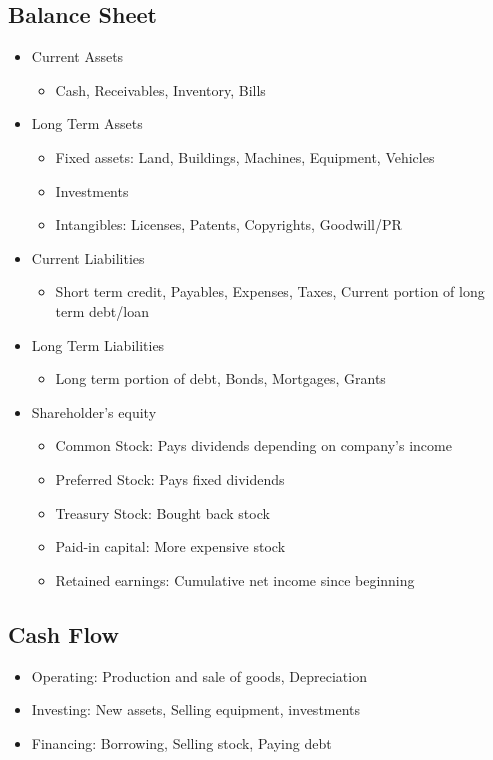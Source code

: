 \documentclass[landscape, letterpaper, 10pt]{article}
\begin{document}
\begin{multicols}{3}
    \subsection*{Balance Sheet}
    \begin{itemize}
        \item Current Assets
              \begin{itemize}
                  \item Cash, Receivables, Inventory, Bills
              \end{itemize}
        \item Long Term Assets
              \begin{itemize}
                  \item Fixed assets: Land, Buildings, Machines, Equipment, Vehicles
                  \item Investments
                  \item Intangibles: Licenses, Patents, Copyrights, Goodwill/PR
              \end{itemize}
        \item Current Liabilities
              \begin{itemize}
                  \item Short term credit, Payables, Expenses, Taxes, Current portion of long term debt/loan
              \end{itemize}
        \item Long Term Liabilities
              \begin{itemize}
                  \item Long term portion of debt, Bonds, Mortgages, Grants
              \end{itemize}
        \item Shareholder's equity
              \begin{itemize}
                  \item Common Stock: Pays dividends depending on company's income
                  \item Preferred Stock: Pays fixed dividends
                  \item Treasury Stock: Bought back stock
                  \item Paid-in capital: More expensive stock
                  \item Retained earnings: Cumulative net income since beginning
              \end{itemize}
    \end{itemize}
    \subsection*{Cash Flow}
    \begin{itemize}
        \item Operating: Production and sale of goods, Depreciation
        \item Investing: New assets, Selling equipment, investments
        \item Financing: Borrowing, Selling stock, Paying debt
    \end{itemize}

\end{multicols}
\end{document}
